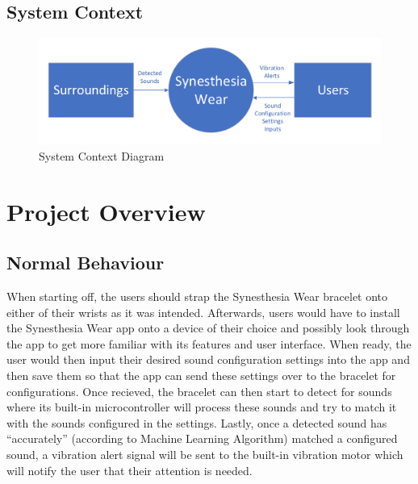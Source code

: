 \documentclass[12pt, titlepage]{article}
\begin{document}
\subsection {System Context}
\begin{figure}[H]
  \includegraphics[width=\textwidth,height=\textheight,keepaspectratio]{ContextDiagram.pdf}
  \caption{System Context Diagram}
  \label{ContextDiagram} 
\end{figure}

\section{Project Overview}

\subsection{Normal Behaviour}
When starting off, the users should strap the Synesthesia Wear bracelet onto either of their wrists as it was intended.
Afterwards, users would have to install the Synesthesia Wear app onto a device of their choice and possibly look through the app 
to get more familiar with its features and user interface. When ready, the user would then input their desired sound configuration 
settings into the app and then save them so that the app can send these settings over to the bracelet for configurations.
Once recieved, the bracelet can then start to detect for sounds where its built-in microcontroller will process these sounds and try to 
match it with the sounds configured in the settings. Lastly, once a detected sound has ``accurately'' (according to Machine Learning Algorithm) matched a configured sound, a vibration 
alert signal will be sent to the built-in vibration motor which will notify the user that their attention is needed.
\end{document}
